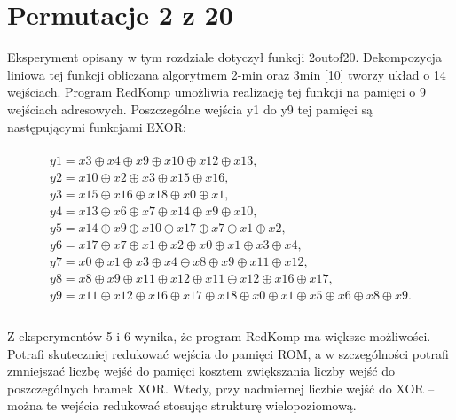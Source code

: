 \section{Permutacje 2 z 20}

Eksperyment opisany w tym rozdziale dotyczył funkcji 2outof20.
Dekompozycja liniowa tej funkcji obliczana algorytmem 2-min oraz 3min [10] tworzy układ o 14 wejściach.
Program RedKomp umożliwia realizację tej funkcji na pamięci o 9 wejściach adresowych.
Poszczególne wejścia y1 do y9 tej pamięci są następującymi funkcjami EXOR:

\begin{multline} \\
y1 = x3 \oplus x4 \oplus x9 \oplus x10 \oplus x12 \oplus x13, \\
y2 = x10 \oplus x2 \oplus x3 \oplus x15 \oplus x16, \\
y3 = x15 \oplus x16 \oplus x18 \oplus x0 \oplus x1, \\
y4 = x13 \oplus x6 \oplus x7 \oplus x14 \oplus x9 \oplus x10, \\
y5 = x14 \oplus x9 \oplus x10 \oplus x17 \oplus x7 \oplus x1 \oplus x2, \\
y6 = x17 \oplus x7 \oplus x1 \oplus x2 \oplus x0 \oplus x1 \oplus x3 \oplus x4, \\
y7 = x0 \oplus x1 \oplus x3 \oplus x4 \oplus x8 \oplus x9 \oplus x11 \oplus x12, \\
y8 = x8 \oplus x9 \oplus x11 \oplus x12 \oplus x11 \oplus x12 \oplus x16 \oplus x17, \\
y9 = x11 \oplus x12 \oplus x16 \oplus x17 \oplus x18 \oplus x0 \oplus x1 \oplus x5 \oplus x6 \oplus x8 \oplus x9. \\
\end{multline} \\

Z eksperymentów 5 i 6 wynika, że program RedKomp ma większe możliwości.
Potrafi skuteczniej redukować wejścia do pamięci ROM,
a w szczególności potrafi zmniejszać liczbę wejść do pamięci
kosztem zwiększania liczby wejść do poszczególnych bramek XOR.
Wtedy, przy nadmiernej liczbie wejść do XOR – można te wejścia redukować stosując strukturę wielopoziomową.
